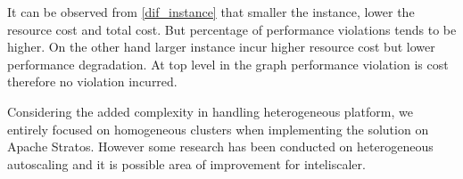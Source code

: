 It can be observed from \ref{dif_instance} that smaller the instance, lower the resource cost and total cost. But percentage of performance violations tends to be higher. On the other hand larger instance incur higher resource cost but lower performance degradation. At top level in the graph performance violation is cost therefore no  violation incurred.

Considering the added complexity in handling heterogeneous platform, we entirely focused on homogeneous clusters when implementing the solution on Apache Stratos. However some research \cite{hetero} has been conducted on heterogeneous autoscaling and it is possible area of improvement for inteliscaler.